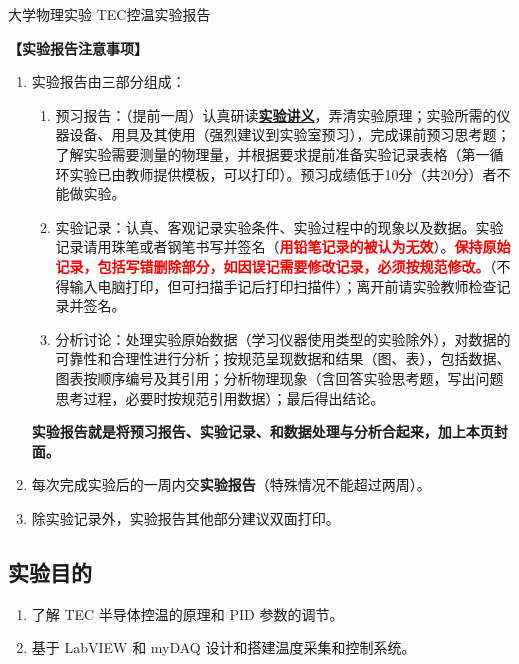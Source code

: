 \documentclass[dvipsnames, svgnames,a4paper,11pt]{article}
\begin{document}

\infoTable{\rule{2.5cm}{0.4pt}}{\rule{2.5cm}{0.4pt}}{\rule{2.5cm}{0.4pt}}{\rule{3cm}{0.4pt}}{\rule{3cm}{0.4pt}}{\rule{3cm}{0.4pt}}

\begin{center}
	\LARGE 大学物理实验 \quad TEC控温实验报告
\end{center}

\textbf{【实验报告注意事项】}
\begin{enumerate}
	\item 实验报告由三部分组成：
	\begin{enumerate}
		\item 预习报告：（提前一周）认真研读\underline{\textbf{实验讲义}}，弄清实验原理；实验所需的仪器设备、用具及其使用（强烈建议到实验室预习），完成课前预习思考题；了解实验需要测量的物理量，并根据要求提前准备实验记录表格（第一循环实验已由教师提供模板，可以打印）。预习成绩低于10分（共20分）者不能做实验。
	    \item 实验记录：认真、客观记录实验条件、实验过程中的现象以及数据。实验记录请用珠笔或者钢笔书写并签名（\textcolor{red}{\textbf{用铅笔记录的被认为无效}}）。\textcolor{red}{\textbf{保持原始记录，包括写错删除部分，如因误记需要修改记录，必须按规范修改。}}（不得输入电脑打印，但可扫描手记后打印扫描件）；离开前请实验教师检查记录并签名。
	    \item 分析讨论：处理实验原始数据（学习仪器使用类型的实验除外），对数据的可靠性和合理性进行分析；按规范呈现数据和结果（图、表），包括数据、图表按顺序编号及其引用；分析物理现象（含回答实验思考题，写出问题思考过程，必要时按规范引用数据）；最后得出结论。
	\end{enumerate}
	\textbf{实验报告就是将预习报告、实验记录、和数据处理与分析合起来，加上本页封面。}
	\item 每次完成实验后的一周内交\textbf{实验报告}（特殊情况不能超过两周）。
	\item 除实验记录外，实验报告其他部分建议双面打印。
\end{enumerate}


\clearpage


\setcounter{section}{0}
	
\subsection{实验目的}
\begin{enumerate}
	\item 了解 TEC 半导体控温的原理和 PID 参数的调节。
	\item 基于 LabVIEW 和 myDAQ 设计和搭建温度采集和控制系统。
\end{enumerate}
\end{document}
